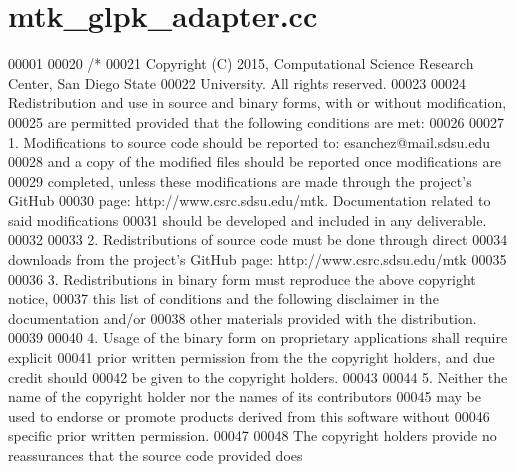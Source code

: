 \hypertarget{mtk__glpk__adapter_8cc_source}{\section{mtk\+\_\+glpk\+\_\+adapter.\+cc}
\label{mtk__glpk__adapter_8cc_source}
}

\begin{DoxyCode}
00001 
00020 \textcolor{comment}{/*}
00021 \textcolor{comment}{Copyright (C) 2015, Computational Science Research Center, San Diego State}
00022 \textcolor{comment}{University. All rights reserved.}
00023 \textcolor{comment}{}
00024 \textcolor{comment}{Redistribution and use in source and binary forms, with or without modification,}
00025 \textcolor{comment}{are permitted provided that the following conditions are met:}
00026 \textcolor{comment}{}
00027 \textcolor{comment}{1. Modifications to source code should be reported to: esanchez@mail.sdsu.edu}
00028 \textcolor{comment}{and a copy of the modified files should be reported once modifications are}
00029 \textcolor{comment}{completed, unless these modifications are made through the project's GitHub}
00030 \textcolor{comment}{page: http://www.csrc.sdsu.edu/mtk. Documentation related to said modifications}
00031 \textcolor{comment}{should be developed and included in any deliverable.}
00032 \textcolor{comment}{}
00033 \textcolor{comment}{2. Redistributions of source code must be done through direct}
00034 \textcolor{comment}{downloads from the project's GitHub page: http://www.csrc.sdsu.edu/mtk}
00035 \textcolor{comment}{}
00036 \textcolor{comment}{3. Redistributions in binary form must reproduce the above copyright notice,}
00037 \textcolor{comment}{this list of conditions and the following disclaimer in the documentation and/or}
00038 \textcolor{comment}{other materials provided with the distribution.}
00039 \textcolor{comment}{}
00040 \textcolor{comment}{4. Usage of the binary form on proprietary applications shall require explicit}
00041 \textcolor{comment}{prior written permission from the the copyright holders, and due credit should}
00042 \textcolor{comment}{be given to the copyright holders.}
00043 \textcolor{comment}{}
00044 \textcolor{comment}{5. Neither the name of the copyright holder nor the names of its contributors}
00045 \textcolor{comment}{may be used to endorse or promote products derived from this software without}
00046 \textcolor{comment}{specific prior written permission.}
00047 \textcolor{comment}{}
00048 \textcolor{comment}{The copyright holders provide no reassurances that the source code provided does}

\end{DoxyCode}
